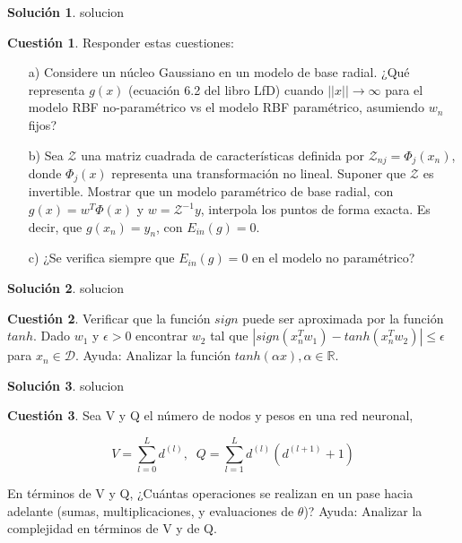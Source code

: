\documentclass[a4paper, 11pt]{article}
\theoremstyle{definition}
\newtheorem{cuestion}{Cuestión}
\newtheorem*{solucion}{Solución}
\begin{document}
  \begin{solucion}
    solucion
  \end{solucion}

  \begin{cuestion}
    Responder estas cuestiones:
    \begin{enumerate}
      \item[a)] Considere un núcleo Gaussiano en un modelo de base radial. ¿Qué representa $g(x)$ (ecuación 6.2 del libro LfD) cuando $||x|| \rightarrow \infty$ para el modelo RBF no-paramétrico vs el modelo RBF paramétrico, asumiendo $w_n$ fijos?
      \item[b)] Sea $\mathcal{Z}$ una matriz cuadrada de características definida por $\mathcal{Z}_{nj}=\Phi_j(x_n)$, donde $\Phi_j(x)$ representa una transformación no lineal. Suponer que $\mathcal{Z}$ es invertible. Mostrar que un modelo paramétrico de base radial, con $g(x) = w^T\Phi(x)$ y $ w = \mathcal{Z}^{-1}y $, interpola los puntos de forma exacta. Es decir, que $g(x_n) = y_n$, con $E_{in}(g) = 0$.
      \item[c)] ¿Se verifica siempre que $E_{in}(g) = 0$ en el modelo no paramétrico?
    \end{enumerate}
  \end{cuestion}

  \begin{solucion}
    solucion
  \end{solucion}

  \begin{cuestion}
    Verificar que la función $sign$ puede ser aproximada por la función $tanh$. Dado $w_1$ y $\epsilon > 0$ encontrar $w_2$ tal que $|sign(x_n^Tw_1) - tanh(x_n^Tw_2)| \leq \epsilon$ para $x_n \in \mathcal{D}$. Ayuda: Analizar la función $tanh(\alpha x), \alpha \in \mathbb{R}$.
  \end{cuestion}

  \begin{solucion}
    solucion
  \end{solucion}

  \begin{cuestion}
    Sea V y Q el número de nodos y pesos en una red neuronal,

    $$ V = \sum_{l=0}^L d^{(l)}, \; \; Q = \sum_{l=1}^L d^{(l)} \left( d^{(l+1)} + 1\right) $$

    En términos de V y Q, ¿Cuántas operaciones se realizan en un pase hacia adelante (sumas, multiplicaciones, y evaluaciones de $\theta$)? Ayuda: Analizar la complejidad en términos de V y de Q.



  \end{cuestion}
\end{document}
